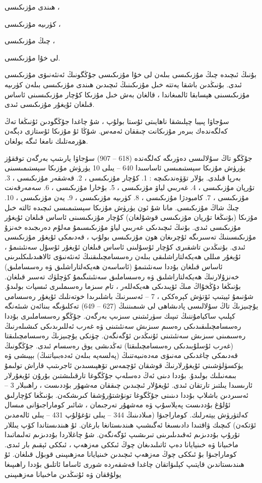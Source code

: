 \documentclass[a4paper]{article}
\begin{document}
ھىندى مۇزىكىسى ،

كۈرىيە مۇزىكىسى ،

چىڭ مۇزىكىسى ،

لى خۇا مۇزىكىسى.

بۇنىڭ ئىچىدە چىڭ مۇزىكىسى بىلەن لى خۇا مۇزىكىسى جۇڭگونىڭ ئەنئەنىۋى مۇزىكىسى ئىدى. بۇنىڭدىن باشقا يەتتە خىل مۇزىكىنىڭ ئىچىدىن ھىندى مۇزىكىسى بىلەن كۈرىيە مۇزىكىسىنى ھېسابقا ئالمىغاندا ، قالغان بەش خىل مۇزىكا كۇچار مۇزىكىسىنى ئاساس قىلغان ئۇيغۇر مۇزىكىسى ئىدى.



سۇجاۋا پىيبا چېلىشقا ناھايىتى ئۇستا بولۇپ ، شۇ چاغدا جۇڭگودىن ئۇنىڭغا تەڭ كەلگەندەك بىرەر مۇزىكانت چىققان ئەمەس. شۇڭا ئۇ مۇزىكا ئۇستازى دېگەن ھۆرمەتلىك نامغا ئىگە بولغان.



جۇڭگو تاڭ سۇلالىسى دەۋرىگە كەلگەندە (618 – 907) سۇجاۋا يارىتىپ بەرگەن توققۇز يۈرۈش مۇزىكا سېستىمىسى ئاساسىدا 640 – يىلى 10 يۈرۈش مۇزىكا سېستىمىسىنى بەرپا قىلدى. بۇلار تۆۋەندىكىچە : 1. كۇچار مۇزىكىسى ، 2. قەشقەر مۇزىكىسى ، 3. تۇرپان مۇزىكىسى ، 4. غەربىي لياۋ مۇزىكىسى ، 5. بۇخارا مۇزىكىسى ، 6. سەمەرقەنت مۇزىكىسى ، 7. كامبودژا مۇزىكىسى ، 8. كۈرىيە مۇزىكىسى ، 9. يەن مۇزىكىسى ، 10. چىڭ شاڭ مۇزىكىسى. مانا شۇ ئون يۈرۈش مۇزىكا سېستىمىسى ئىچىدە ئالتە خىل مۇزىكا (بۇنىڭغا تۇرپان مۇزىكىسى قوشۇلغان) كۇچار مۇزىكىسىنى ئاساس قىلغان ئۇيغۇر مۇزىكىسى ئىدى. بۇنىڭ ئىچىدىكى غەربىي لياۋ مۇزىكىسىمۇ مەلۇم دەرىجىدە خەنزۇ مۇزىكىسىنىڭ تەسىرىگە ئۇچرىغان ھون مۇزىكىسى بولۇپ ، قەدىمكى ئۇيغۇر مۇزىكىسى ئىدى. بۇنىڭدىن تاشقىرى كۇچار ئۇسۇلىنى ئاساس قىلغان ئۇيغۇر ئۇسۇل سەنئىتىمۇ ، ئۇيغۇر مىللى ھەيكەلتاراشلىقى بىلەن رەسسامچىلىقنىڭ ئەنئەنىۋى ئالاھىدىلىكلىرىنى ئاساس قىلغان بۇددا سەنئىتىمۇ (ئاساسەن ھەيكەلتاراشلىق ۋە رەسساملىق) خەنزۇلارنىڭ ھەيكەلتاراشلىق ۋە رەسساملىق سەنئىتىگىمۇ كۈچلۈك تەسىر قىلغان. بۇنىڭغا دۇڭخۇاڭ مىڭ ئۆيىدىكى ھەيكەللەر ، تام سىزما رەسىملىرى ئىسپات بولىدۇ. شۇنىمۇ ئېيتىپ ئۆتۈش كېرەككى ، 7 – ئەسىرنىڭ باشلىرىدا خوتەنلىك ئۇيغۇر رەسسامى يۇچىيزىڭ تاڭ سۇلالىسى پادىشاھى لى شىمىننىڭ (627 – 649) تەكلىۋىگە بىنائەن شىئەنگە كېلىپ ساكيامۇننىڭ تىپىك سۈرئىتىنى سىزىپ بەرگەن. جۇڭگو رەسساملىرى بۇددا رەسسامچىلىقىدىكى رەسىم سىزىش سەنئىتىنى ۋە غەرب ئەللىرىدىكى كىشىلەرنىڭ رەسىمىنى سىزىش سەنئىتىنى ئۇنىڭدىن ئۆگەنگەن. چۈنكى يۇچىيزىڭ رەسسامچىلىقتا (غەرب ئۇسلۇبىدىكى رەسسامچىلىقتا) تەڭدىشى يوق رەسسام ئىدى. جۇڭگونىڭ قەدىمكى چاغدىكى مەنىۋى مەدەنىيەتنىڭ (پەلسەپە بىلەن ئەدەبىياتنىڭ) بېيىشى ۋە يۈكسۈلۈشىنى ئۇيغۇرلارنىڭ قوشقان ئۆچمەس تۆھپىسىدىن ئاجرىتىپ قاراش تولىمۇ بىمەنىلىك بولىدۇ. بۇددا دىنى ئەڭ دەسلەپ جۇڭگوغا تارقىلىشتىن بۇرۇن ئۇيغۇرلار ئارىسىدا يىلتىز تارتقان ئىدى. ئۇيغۇلار ئىچىدىن چىققان مەشھۇر بۇددىست ، راھىبلار 3 – ئەسىردىن باشلاپ بۇددا دىنىنى جۇڭگوغا تونۇشتۇرۇشقا كىرىشكەن. بۇنىڭغا كۇچارلىق ئۇلۇغ بۇددىست پەيلاسۇپ ۋە مەشھۇر تەرجىمان ، شائىر كوماراجىۋانى مىسال كەلتۈرۈش يېتەرلىك. كوماراجىۋا (مىلادىنىڭ 344 – يىلى تۇغۇلۇپ 431 – يىلى ئالەمدىن ئۆتكەن) كىچىك ۋاقتىدا دادىسىغا ئەگىشىپ ھىندىستانغا بارغان. ئۇ ھىندىستاندا كۆپ يىللار تۇرۇپ بۇددىزىم ئەقىدىلىرىنى تىرىشىپ ئۆگەنگەن. شۇ چاغلاردا بۇددىزىم تەلىماتىدا ماخىيانا ۋە خىنيايانا دەپ ئاتىلىدىغان چوڭ ئىككى مەزھەپ ، ئىككى ئېقىم بار ئىدى. كوماراجىۋا بۇ ئىككى چوڭ مەزھەپ ئىچىدىن خىنيايانا مەزھىپىنى قوبۇل قىلغان. ئۇ ھىندىستاندىن قايتىپ كېلىۋاتقان چاغدا قەشقەردە شورى ئاساما ئاتلىق بۇددا راھىپىغا يولۇققان ۋە ئۇنىڭدىن ماخىيانا مەزھىپىنى 
\end{document}
